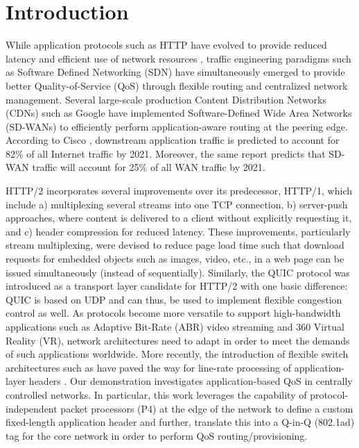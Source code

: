 \section{Introduction}
\label{sec:intro}
While application protocols such as HTTP have evolved to provide reduced latency and efficient use of network resources \cite{rfc7540}, traffic engineering paradigms such as Software Defined Networking (SDN) have simultaneously emerged to provide better Quality-of-Service (QoS) through flexible routing and centralized network management. Several large-scale production Content Distribution Networks (CDNs) such as Google  \cite{Yap:2017}  %
have implemented Software-Defined Wide Area Networks (SD-WANs) to efficiently perform application-aware routing at the peering edge. According to Cisco \cite{cisco-17}, downstream application traffic is predicted to account for 82\% of all Internet traffic by 2021. Moreover, the same report predicts that SD-WAN traffic will account for 25\% of all WAN traffic by 2021.

HTTP/2 incorporates several improvements over its predecessor, HTTP/1, which include a) multiplexing several streams into one TCP connection, b) server-push approaches, where content is delivered to a client without explicitly requesting it, and c) header compression for reduced latency. These improvements, particularly stream multiplexing, were devised to reduce page load time such that download requests for embedded objects such as images, video, etc., in a web page can be issued simultaneously (instead of sequentially). Similarly, the QUIC \cite{Langley:SIGCOMM:2017} protocol was introduced as a transport layer candidate for HTTP/2 with one basic difference: QUIC is based on UDP and can thus, be used to implement flexible congestion control as well. As protocols become more versatile to support high-bandwidth applications such as Adaptive Bit-Rate (ABR) video streaming and 360 Virtual Reality (VR), network architectures need to adapt in order to meet the demands of such applications worldwide. More recently, the introduction of flexible switch architectures such as \cite{Bosshart:2014} have paved the way for line-rate processing of application-layer headers \cite{jin2017netcache}.
Our demonstration investigates application-based QoS in centrally controlled networks. In particular, this work leverages the capability of protocol-independent packet processors (P4) \cite{Bosshart:2014} at the edge of the network to define a custom fixed-length application header and further, translate this into a Q-in-Q (802.1ad) tag \cite{IEEE802.1ad:standard} for the core network in order to perform QoS routing/provisioning.


